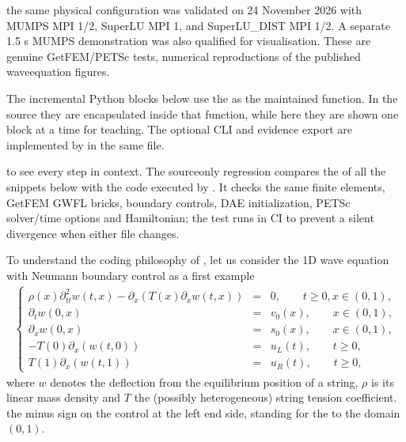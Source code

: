 \documentclass[letterpaper,10pt,english]{sphinxmanual}
\begin{document}
\sphinxAtStartPar
{} the same physical configuration was
validated on 24 November 2026 with MUMPS MPI 1/2, SuperLU MPI 1,
and SuperLU\_DIST MPI 1/2. A separate 1.5 s MUMPS demonstration
was also qualified for visualisation. These are genuine
GetFEM/PETSc tests,  numerical reproductions of the
published wave\sphinxhyphen{}equation figures.

\sphinxAtStartPar
The incremental Python blocks below use the  as the maintained
 function. In the source they are encapsulated
inside that function, while here they are shown one block at
a time for teaching. The optional CLI and evidence export
are implemented by  in the same file.

\sphinxAtStartPar
{} to see every step in context.
The source\sphinxhyphen{}only regression
 compares the
 of all the snippets below with
the code executed by . It checks the
same finite elements, GetFEM GWFL bricks, boundary
controls, DAE initialization, PETSc solver/time options
and Hamiltonian; the test runs in CI to prevent a
silent divergence when either file changes.

\sphinxAtStartPar
To understand the coding philosophy of , let us consider the 1D wave equation with Neumann boundary control as a first example
\begin{equation*}
\begin{split}\left\lbrace
\begin{array}{rcl}
\rho(x) \partial_{tt}^2 w(t,x) - \partial_x \left( T(x) \partial_x w(t,x) \right) &=& 0, \qquad t \ge 0, x \in (0,1), \\
\partial_t w(0,x) &=& v_0(x), \qquad x \in (0,1), \\
\partial_x w(0,x) &=& s_0(x), \qquad x \in (0,1), \\
- T(0) \partial_x \left( w(t,0) \right) &=& u_L(t), \qquad t \ge 0, \\
T(1) \partial_x \left( w(t,1) \right) &=& u_R(t), \qquad t \ge 0,
\end{array}
\right.\end{split}
\end{equation*}
\sphinxAtStartPar
where \(w\) denotes the deflection from the equilibrium position of
a string, \(\rho\) is its linear mass density and \(T\)
the (possibly heterogeneous) string tension coefficient.  the minus sign on the control at the left end side,
standing for the  to the domain \((0,1)\).
\end{document}
